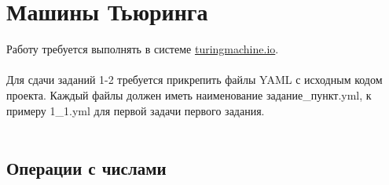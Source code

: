 \documentclass{article}
\begin{document}
\section{Машины Тьюринга}

Работу требуется выполнять в системе \url{turingmachine.io}. \\\\
Для сдачи заданий 1-2 требуется прикрепить файлы YAML с исходным кодом проекта. Каждый файлы должен иметь наименование задание\_пункт.yml, к примеру 1\_1.yml для первой задачи первого задания. \\\\

\subsection{Операции с числами}
\end{document}
